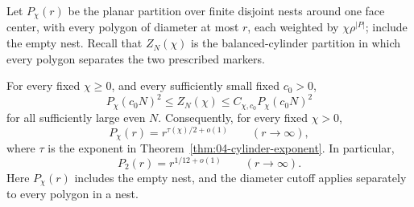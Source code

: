 Let \(P_\chi(r)\) be the planar partition over finite disjoint nests around one face center, with every polygon of diameter at most \(r\), each weighted by \(\chi\rho^{|P|}\); include the empty nest. Recall that \(Z_N(\chi)\) is the balanced-cylinder partition in which every polygon separates the two prescribed markers.

\begin{theorem}
\label{thm:05-nest-normalization}\label{E:planar-nesting}
For every fixed \(\chi\ge0\), and every sufficiently small fixed
\(c_0>0\),
\begin{equation}
 P_\chi(c_0N)^2
 \le Z_N(\chi)
 \le C_{\chi,c_0}P_\chi(c_0N)^2
 \label{eq:05-cylinder-planar-comparison}
\end{equation}
for all sufficiently large even \(N\). Consequently, for every fixed \(\chi>0\),
\begin{equation}
 P_\chi(r)=r^{\tau(\chi)/2+o(1)}\qquad(r\longrightarrow\infty),
 \label{eq:05-planar-all-fugacity}
\end{equation}
where \(\tau\) is the exponent in Theorem~\ref{thm:04-cylinder-exponent}.
In particular,
\begin{equation}
 P_2(r)=r^{1/12+o(1)}\qquad(r\longrightarrow\infty).
 \label{eq:05-planar-nest-scaling}
\end{equation}
Here \(P_\chi(r)\) includes the empty nest, and the diameter cutoff
applies separately to every polygon in a nest.
\end{theorem}


